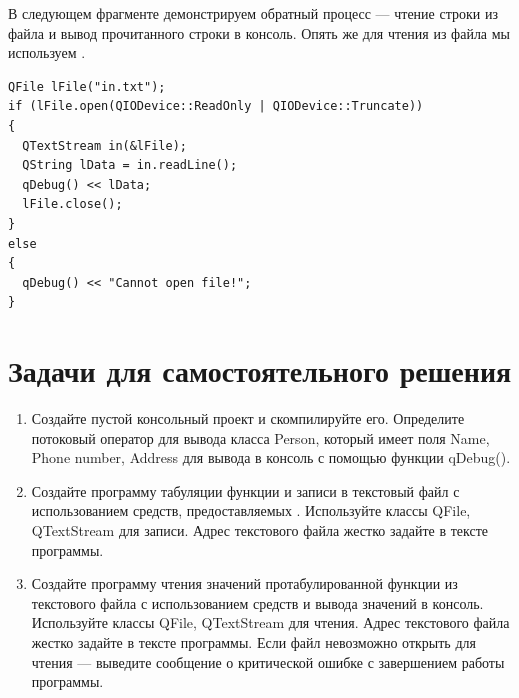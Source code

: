 В следующем фрагменте демонстрируем обратный процесс --- чтение строки из файла и вывод прочитанного строки
в консоль. Опять же для чтения из файла мы
используем .
\begin{lstlisting}
QFile lFile("in.txt");
if (lFile.open(QIODevice::ReadOnly | QIODevice::Truncate))
{
  QTextStream in(&lFile);
  QString lData = in.readLine();
  qDebug() << lData;
  lFile.close();
}
else
{
  qDebug() << "Cannot open file!";
}
\end{lstlisting}


\section{Задачи для самостоятельного решения}
\begin{enumerate}
\item Создайте пустой консольный проект  и скомпилируйте его. Определите потоковый оператор для вывода
класса Person, который имеет поля Name, Phone number, Address для вывода в консоль с помощью функции qDebug(). 
\item Создайте программу табуляции функции и записи в текстовый файл с использованием средств,
предоставляемых . Используйте классы QFile, QTextStream для записи. Адрес текстового файла жестко задайте в тексте
программы. 
\item Создайте программу чтения значений протабулированной функции из
текстового файла с использованием средств  и вывода значений в консоль. Используйте классы QFile, QTextStream для
чтения. Адрес текстового файла жестко задайте в тексте программы. Если файл невозможно открыть для чтения --- выведите
сообщение о критической ошибке с завершением работы программы. 
\end{enumerate}
